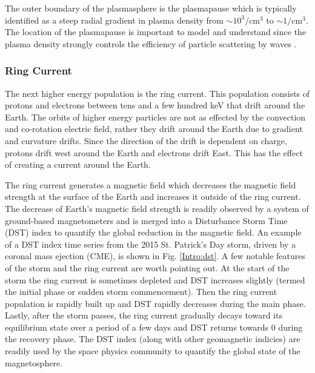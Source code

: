 The outer boundary of the plasmasphere is the plasmapause which is typically identified as a steep radial gradient in plasma density from $\sim 10^3 / \mathrm{cm}^3$ to $\sim 1 / \mathrm{cm}^3$. The location of the plasmapause is important to model \citep[e.g.][]{O'Brien2003empirical} and understand since the plasma density strongly controls the efficiency of particle scattering by waves \citep[e.g.][]{Horne2005}.

\subsubsection{Ring Current}
The next higher energy population is the ring current. This population consists of protons and electrons between tens and a few hundred keV that drift around the Earth. The orbits of higher energy particles are not as effected by the convection and co-rotation electric field, rather they drift around the Earth due to gradient and curvature drifts. Since the direction of the drift is dependent on charge, protons drift west around the Earth and electrons drift East. This has the effect of creating a current around the Earth. 

The ring current generates a magnetic field which decreases the magnetic field strength at the surface of the Earth and increases it outside of the ring current. The decrease of Earth's magnetic field strength is readily observed by a system of ground-based magnetometers and is merged into a Disturbance Storm Time (DST) index to quantify the global reduction in the magnetic field. An example of a DST index time series from the 2015 St. Patrick's Day storm, driven by a coronal mass ejection (CME), is shown in Fig. \ref{Intro:dst}. A few notable features of the storm and the ring current are worth pointing out. At the start of the storm the ring current is sometimes depleted and DST increases slightly (termed the initial phase or sudden storm commencement). Then the ring current population is rapidly built up and DST rapidly decreases during the main phase. Lastly, after the storm passes, the ring current gradually decays toward its equilibrium state over a period of a few days and DST returns towards 0 during the recovery phase. The DST index (along with other geomagnetic indicies) are readily used by the space physics community to quantify the global state of the magnetosphere.

